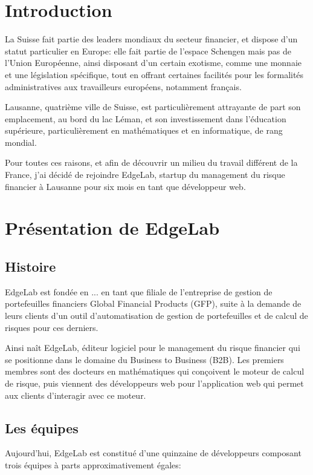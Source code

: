 \documentclass[a4paper,french,12pt]{article}
\begin{document}
\newpage

\section{Introduction}

	La Suisse fait partie des leaders mondiaux du secteur financier, et dispose d'un statut particulier en Europe: elle fait partie de l'espace Schengen mais pas de l'Union Européenne, ainsi disposant d'un certain exotisme, comme une monnaie et une législation spécifique, tout en offrant certaines facilités pour les formalités administratives aux travailleurs européens, notamment français.
	
	
	Lausanne, quatrième ville de Suisse, est particulièrement attrayante de part son emplacement, au bord du lac Léman, et son investissement dans l'éducation supérieure, particulièrement en mathématiques et en informatique, de rang mondial.

	Pour toutes ces raisons, et afin de découvrir un milieu du travail différent de la France, j'ai décidé de rejoindre EdgeLab, startup du management du risque financier à Lausanne pour six mois en tant que développeur web.

\section{Présentation de EdgeLab}

	\subsection{Histoire}
		EdgeLab est fondée en ... en tant que filiale de l'entreprise de gestion de portefeuilles financiers Global Financial Products (GFP), suite à la demande de leurs clients d'un outil d'automatisation de gestion de portefeuilles et de calcul de risques pour ces derniers.

	Ainsi naît EdgeLab, éditeur logiciel pour le management du risque financier qui se positionne dans le domaine du Business to Business (B2B). Les premiers membres sont des docteurs en mathématiques qui conçoivent le moteur de calcul de risque, puis viennent des développeurs web pour l'application web qui permet aux clients d’interagir avec ce moteur.	
	
	\subsection{Les équipes}
			Aujourd'hui, EdgeLab est constitué d'une quinzaine de développeurs composant trois équipes à parts approximativement égales:
\end{document}
